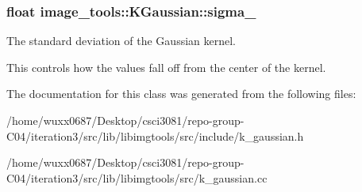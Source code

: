 \subsubsection[{\texorpdfstring{sigma\+\_\+}{sigma_}}]{\setlength{\rightskip}{0pt plus 5cm}float image\+\_\+tools\+::\+K\+Gaussian\+::sigma\+\_\+\hspace{0.3cm}{\ttfamily [protected]}}\hypertarget{classimage__tools_1_1KGaussian_aae4a308fd2f1065b363660681c863eed}{}\label{classimage__tools_1_1KGaussian_aae4a308fd2f1065b363660681c863eed}


The standard deviation of the Gaussian kernel. 

This controls how the values fall off from the center of the kernel. 

The documentation for this class was generated from the following files\+:\begin{DoxyCompactItemize}
\item 
/home/wuxx0687/\+Desktop/csci3081/repo-\/group-\/\+C04/iteration3/src/lib/libimgtools/src/include/k\+\_\+gaussian.\+h\item 
/home/wuxx0687/\+Desktop/csci3081/repo-\/group-\/\+C04/iteration3/src/lib/libimgtools/src/k\+\_\+gaussian.\+cc\end{DoxyCompactItemize}
